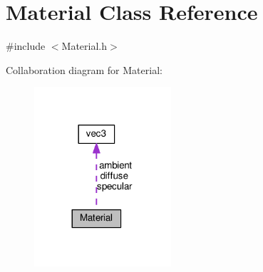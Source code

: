 \hypertarget{structMaterial}{}\section{Material Class Reference}
\label{structMaterial}


{\ttfamily \#include $<$Material.\+h$>$}



Collaboration diagram for Material\+:
\nopagebreak
\begin{figure}[H]
\begin{center}
\leavevmode
\includegraphics[width=144pt]{structMaterial__coll__graph}
\end{center}
\end{figure}
